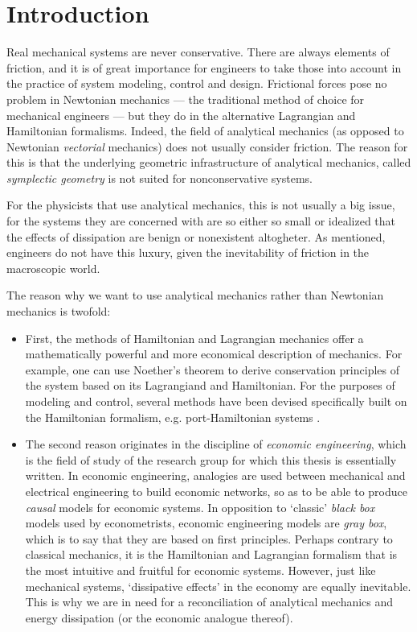 \chapter{Introduction}
\label{chap:intro}

Real mechanical systems are never conservative. There are always elements of friction, and it is of great importance for engineers to take those into account in the practice of system modeling, control and design. Frictional forces pose no problem in Newtonian mechanics --- the traditional method of choice for mechanical engineers --- but they do in the alternative Lagrangian and Hamiltonian formalisms. Indeed, the field of analytical mechanics (as opposed to Newtonian \emph{vectorial} mechanics) does not usually consider friction. The reason for this is that the underlying geometric infrastructure of analytical mechanics, called \emph{symplectic geometry} is not suited for nonconservative systems.

For the physicists that use analytical mechanics, this is not usually a big issue, for the systems they are concerned with are so either so small or idealized that the effects of dissipation are benign or nonexistent altogheter. As mentioned, engineers do not have this luxury, given the inevitability of friction in the macroscopic world.

The reason why we want to use analytical mechanics rather than Newtonian mechanics is twofold:
\begin{itemize}
    \item First, the methods of Hamiltonian and Lagrangian mechanics offer a mathematically powerful and more economical description of mechanics. For example, one can use Noether's theorem to derive conservation principles of the system based on its Lagrangiand and Hamiltonian. For the purposes of modeling and control, several methods have been devised specifically built on the Hamiltonian formalism, e.g. port-Hamiltonian systems \cite{VanDerSchaft2006}. 
    \item The second reason originates in the discipline of \emph{economic engineering}, which is the field of study of the research group for which this thesis is essentially written. In economic engineering, analogies are used between mechanical and electrical engineering to build economic networks, so as to be able to produce \emph{causal} models for economic systems. In opposition to `classic' \emph{black box} models used by econometrists, economic engineering models are \emph{gray box}, which is to say that they are based on first principles. Perhaps contrary to classical mechanics, it is the Hamiltonian and Lagrangian formalism that is the most intuitive and fruitful for economic systems. However, just like mechanical systems, `dissipative effects' in the economy are equally inevitable. This is why we are in need for a reconciliation of analytical mechanics and energy dissipation (or the economic analogue thereof).
\end{itemize}

